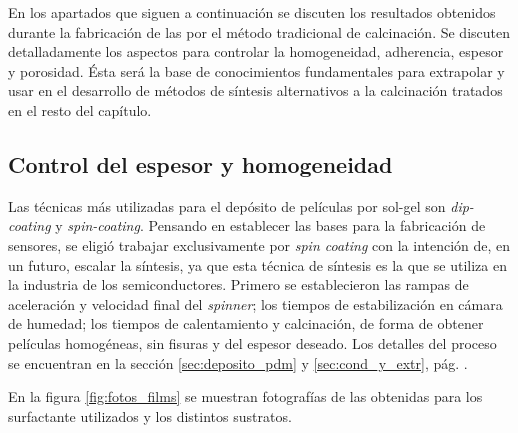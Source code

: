 		En los apartados que siguen a continuación se discuten los resultados obtenidos durante la fabricación de las \pdm\space por el método tradicional de calcinación. Se discuten detalladamente los aspectos para controlar la homogeneidad, adherencia, espesor y porosidad. Ésta será la base de conocimientos fundamentales para extrapolar y usar en el desarrollo de métodos de síntesis alternativos a la calcinación tratados en el resto del capítulo.

	\subsection{Control del espesor y homogeneidad}
		
		Las técnicas más utilizadas para el depósito de películas por sol-gel son \textit{dip-coating} y \textit{spin-coating}. 
		Pensando en establecer las bases para la fabricación de sensores, se eligió trabajar exclusivamente por \textit{spin coating} con la intención de, en un futuro, escalar la síntesis, ya que esta técnica de síntesis es la que se utiliza en la industria de los semiconductores.\cite{Franssila2004,Jaeger2001} Primero se establecieron las rampas de aceleración y velocidad final del \textit{spinner}; los tiempos de estabilización en cámara de humedad; los tiempos de calentamiento y calcinación, de forma de obtener películas homogéneas, sin fisuras y del espesor deseado. Los detalles del proceso se encuentran en la sección \ref{sec:deposito_pdm} y \ref{sec:cond_y_extr}, pág. \pageref{sec:deposito_pdm}. 

		En la figura \ref{fig:fotos_films} se muestran fotografías de las \pdm\space obtenidas para los surfactante utilizados y los distintos sustratos. 

